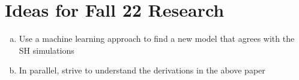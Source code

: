 \documentclass[12pt]{article}
\begin{document}
\section{Ideas for Fall 22 Research}
\begin{enumerate}[(a)]
    \item Use a machine learning approach to find a new model that agrees with the SH simulations
    \item In parallel, strive to understand the derivations in the above paper
\end{enumerate}
\end{document}
